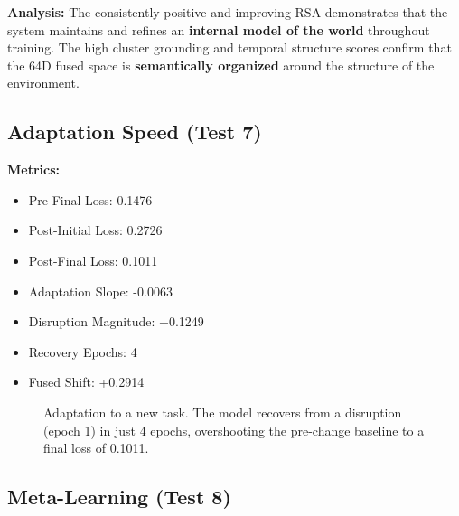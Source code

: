 \documentclass[12pt]{article}
\begin{document}
\textbf{Analysis:}
The consistently positive and improving RSA demonstrates that the
system maintains and refines an \textbf{internal model of the world}
throughout training. The high cluster grounding and temporal structure
scores confirm that the 64D fused space is \textbf{semantically
organized} around the structure of the environment.

\subsection{Adaptation Speed (Test 7)}
\label{subsec:test7}

\textbf{Metrics:}
\begin{itemize}
    \item Pre-Final Loss: 0.1476
    \item Post-Initial Loss: 0.2726
    \item Post-Final Loss: 0.1011
    \item Adaptation Slope: -0.0063
    \item Disruption Magnitude: +0.1249
    \item Recovery Epochs: 4
    \item Fused Shift: +0.2914
\end{itemize}

\begin{figure}[H]
\centering
{}
\caption{Adaptation to a new task. The model recovers from a
disruption (epoch 1) in just 4 epochs, overshooting the pre-change
baseline to a final loss of 0.1011.}
\label{fig:adaptation}
\end{figure}

\subsection{Meta-Learning (Test 8)}
\label{subsec:test8}
\end{document}
